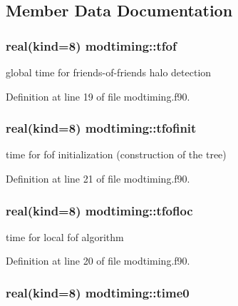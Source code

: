 \subsection{Member Data Documentation}
\hypertarget{classmodtiming_ac6dbf200ea4d6d6248bb9df21ed8d2a7}{
\subsubsection[{tfof}]{\setlength{\rightskip}{0pt plus 5cm}real(kind=8) modtiming\-::tfof}}\label{classmodtiming_ac6dbf200ea4d6d6248bb9df21ed8d2a7}


global time for friends-\/of-\/friends halo detection 



Definition at line 19 of file modtiming.\-f90.

\hypertarget{classmodtiming_a2c5b98c383953b670ee94c1022c2d822}{
\subsubsection[{tfofinit}]{\setlength{\rightskip}{0pt plus 5cm}real(kind=8) modtiming\-::tfofinit}}\label{classmodtiming_a2c5b98c383953b670ee94c1022c2d822}


time for fof initialization (construction of the tree) 



Definition at line 21 of file modtiming.\-f90.

\hypertarget{classmodtiming_a2574a405aaa97058f43e1e6b0b1d96e1}{
\subsubsection[{tfofloc}]{\setlength{\rightskip}{0pt plus 5cm}real(kind=8) modtiming\-::tfofloc}}\label{classmodtiming_a2574a405aaa97058f43e1e6b0b1d96e1}


time for local fof algorithm 



Definition at line 20 of file modtiming.\-f90.

\hypertarget{classmodtiming_aa15cbf8a08e28c5209481b3ed5f11090}{
\subsubsection[{time0}]{\setlength{\rightskip}{0pt plus 5cm}real(kind=8) modtiming\-::time0}}\label{classmodtiming_aa15cbf8a08e28c5209481b3ed5f11090}


